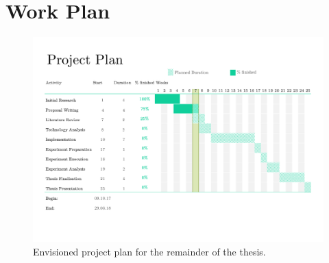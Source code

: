 %
\chapter{Work Plan}
\label{sec:workplan}

\begin{figure}[htb]
        \includegraphics[height=.91 \textwidth,angle=90,keepaspectratio]{gfx/project-plan}
        \caption{Envisioned project plan for the remainder of the thesis.}
        \label{fig:workplan}
\end{figure}
